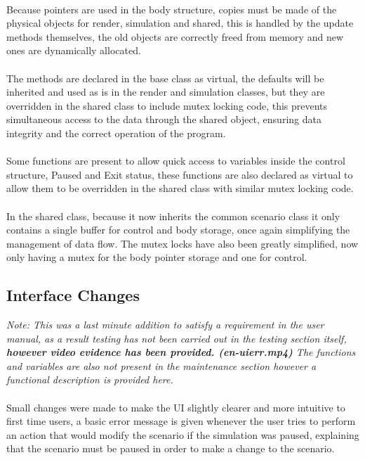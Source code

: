 {\paragraph{}
Because pointers are used in the body structure, copies must be made of the physical objects for render, simulation and shared, this is handled by the update methods themselves, the old objects are correctly freed from memory and new ones are dynamically allocated.

\paragraph{}
The methods are declared in the base class as virtual, the defaults will be inherited and used as is in the render and simulation classes, but they are overridden in the shared class to include mutex locking code, this prevents simultaneous access to the data through the shared object, ensuring data integrity and the correct operation of the program.

\paragraph{}
Some functions are present to allow quick access to variables inside the control structure, Paused and Exit status, these functions are also declared as virtual to allow them to be overridden in the shared class with similar mutex locking code.

\paragraph{}
In the shared class, because it now inherits the common scenario class it only contains a single buffer for control and body storage, once again simplifying the management of data flow. The mutex locks have also been greatly simplified, now only having a mutex for the body pointer storage and one for control.

\subsection{Interface Changes}
\textit{Note: This was a last minute addition to satisfy a requirement in the user manual, as a result testing has not been carried out in the testing section itself, \textbf{however video evidence has been provided. (en-uierr.mp4)} The functions and variables are also not present in the maintenance section however a functional description is provided here.}
\paragraph{}
Small changes were made to make the UI slightly clearer and more intuitive to first time users, a basic error message is given whenever the user tries to perform an action that would modify the scenario if the simulation was paused, explaining that the scenario must be paused in order to make a change to the scenario.

}
